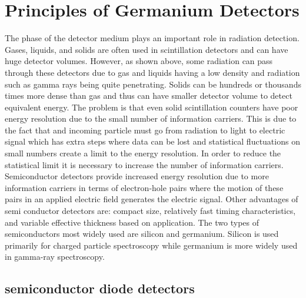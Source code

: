 \chapter{Principles of Germanium Detectors}
The phase of the detector medium plays an important role in radiation detection.
Gases, liquids, and solids are often used in scintillation detectors and can have huge detector volumes.
However, as shown above, some radiation can pass through these detectors due to gas and liquids having a low density and radiation such as gamma rays being quite penetrating.
Solids can be hundreds or thousands times more dense than gas and thus can have smaller detector volume to detect equivalent energy.
The problem is that even solid scintillation counters have poor energy resolution due to the small number of information carriers.
This is due to the fact that and incoming particle must go from radiation to light to electric signal which has extra steps where data can be lost and statistical fluctuations on small numbers create a limit to the energy resolution.
In order to reduce the statistical limit it is necessary to increase the number of information carriers.
Semiconductor detectors provide increased energy resolution due to more information carriers in terms of electron-hole pairs where the motion of these pairs in an applied electric field generates the electric signal.
Other advantages of semi conductor detectors are: compact size, relatively fast timing characteristics, and variable effective thickness based on application.
The two types of semiconductors most widely used are silicon and germanium.
Silicon is used primarily for charged particle spectroscopy while germanium is more widely used in gamma-ray spectroscopy.

\section{semiconductor diode detectors} 

